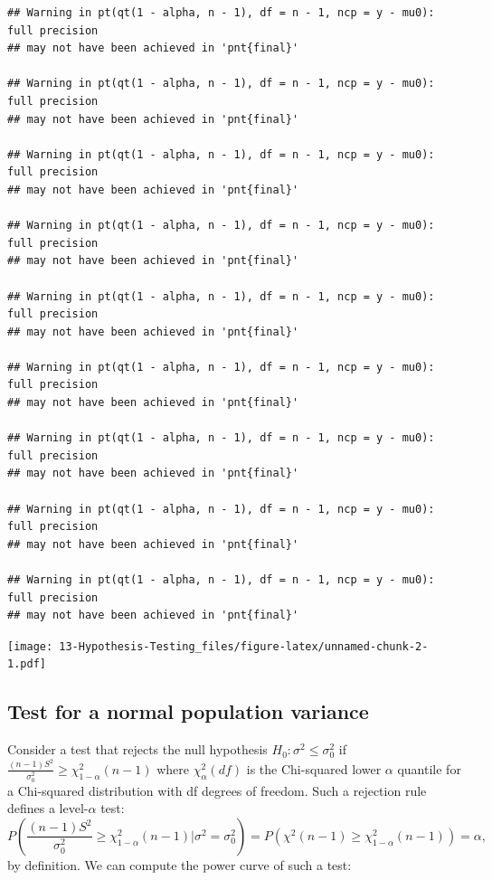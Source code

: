 \documentclass[]{book}
\begin{document}
\begin{verbatim}
## Warning in pt(qt(1 - alpha, n - 1), df = n - 1, ncp = y - mu0): full precision
## may not have been achieved in 'pnt{final}'

## Warning in pt(qt(1 - alpha, n - 1), df = n - 1, ncp = y - mu0): full precision
## may not have been achieved in 'pnt{final}'

## Warning in pt(qt(1 - alpha, n - 1), df = n - 1, ncp = y - mu0): full precision
## may not have been achieved in 'pnt{final}'

## Warning in pt(qt(1 - alpha, n - 1), df = n - 1, ncp = y - mu0): full precision
## may not have been achieved in 'pnt{final}'

## Warning in pt(qt(1 - alpha, n - 1), df = n - 1, ncp = y - mu0): full precision
## may not have been achieved in 'pnt{final}'

## Warning in pt(qt(1 - alpha, n - 1), df = n - 1, ncp = y - mu0): full precision
## may not have been achieved in 'pnt{final}'

## Warning in pt(qt(1 - alpha, n - 1), df = n - 1, ncp = y - mu0): full precision
## may not have been achieved in 'pnt{final}'

## Warning in pt(qt(1 - alpha, n - 1), df = n - 1, ncp = y - mu0): full precision
## may not have been achieved in 'pnt{final}'

## Warning in pt(qt(1 - alpha, n - 1), df = n - 1, ncp = y - mu0): full precision
## may not have been achieved in 'pnt{final}'
\end{verbatim}

\texttt{[image: 13-Hypothesis-Testing\_files/figure-latex/unnamed-chunk-2-1.pdf]}

\subsection{Test for a normal population
variance}\label{test-for-a-normal-population-variance}

Consider a test that rejects the null hypothesis
\(H_0:\sigma^2 \leq \sigma_0^2\) if
\(\frac{(n-1)S^2}{\sigma_0^2} \geq \chi^2_{1-\alpha}(n-1)\) where
\(\chi^2_{\alpha}(df)\) is the Chi-squared lower \(\alpha\) quantile for
a Chi-squared distribution with df degrees of freedom. Such a rejection
rule defines a level-\(\alpha\) test:
\[P\left(\frac{(n-1)S^2}{\sigma_0^2} \geq  \chi^2_{1-\alpha}(n-1)|\sigma^2 = \sigma_0^2\right) = P\left(\chi^{2}(n-1) \geq  \chi^2_{1-\alpha}(n-1)\right) = \alpha,\]
by definition. We can compute the power curve of such a test:
\end{document}
